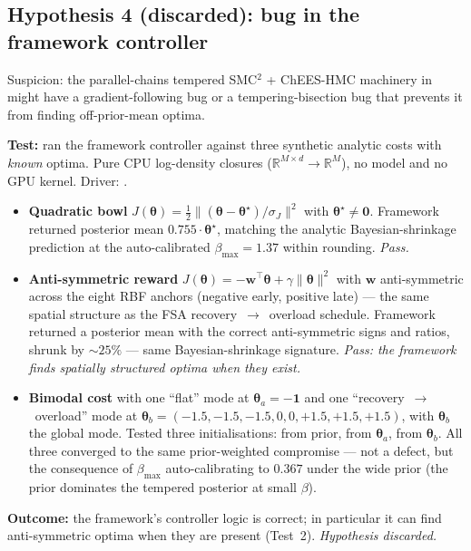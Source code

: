 \documentclass[11pt,a4paper]{article}
\begin{document}
\subsection{Hypothesis 4 (discarded): bug in the framework controller}

Suspicion: the parallel-chains tempered SMC$^2$ + ChEES-HMC machinery
in  might have a
gradient-following bug or a tempering-bisection bug that prevents it
from finding off-prior-mean optima.

\textbf{Test:} ran the framework controller against three synthetic
analytic costs with \emph{known} optima. Pure CPU log-density closures
($\mathbb R^{M\times d} \to \mathbb R^M$), no model and no GPU kernel.
Driver: .

\begin{itemize}[itemsep=4pt,leftmargin=*]
\item \textbf{Quadratic bowl} $J(\bm\theta)=\tfrac12 \|(\bm\theta -
  \bm\theta^\star)/\sigma_J\|^2$ with $\bm\theta^\star \neq \mathbf 0$.
  Framework returned posterior mean $0.755\cdot \bm\theta^\star$,
  matching the analytic Bayesian-shrinkage prediction at the
  auto-calibrated $\beta_{\max}=1.37$ within rounding. \emph{Pass.}
\item \textbf{Anti-symmetric reward} $J(\bm\theta) = -\bm w^\top
  \bm\theta + \gamma\|\bm\theta\|^2$ with $\bm w$ anti-symmetric across
  the eight RBF anchors (negative early, positive late) — the same
  spatial structure as the FSA recovery~$\to$~overload schedule.
  Framework returned a posterior mean with the correct anti-symmetric
  signs and ratios, shrunk by $\sim 25\%$ — same Bayesian-shrinkage
  signature. \emph{Pass: the framework finds spatially structured
  optima when they exist.}
\item \textbf{Bimodal cost} with one ``flat'' mode at
  $\bm\theta_a = -\mathbf 1$ and one ``recovery~$\to$~overload'' mode
  at $\bm\theta_b = (-1.5,-1.5,-1.5,0,0,+1.5,+1.5,+1.5)$, with
  $\bm\theta_b$ the global mode. Tested three initialisations: from
  prior, from $\bm\theta_a$, from $\bm\theta_b$. All three converged to
  the same prior-weighted compromise — not a defect, but the consequence
  of $\beta_{\max}$ auto-calibrating to $0.367$ under the wide prior
  (the prior dominates the tempered posterior at small $\beta$).
\end{itemize}

\textbf{Outcome:} the framework's controller logic is correct; in
particular it can find anti-symmetric optima when they are present
(Test~2). \emph{Hypothesis discarded.}
\end{document}
